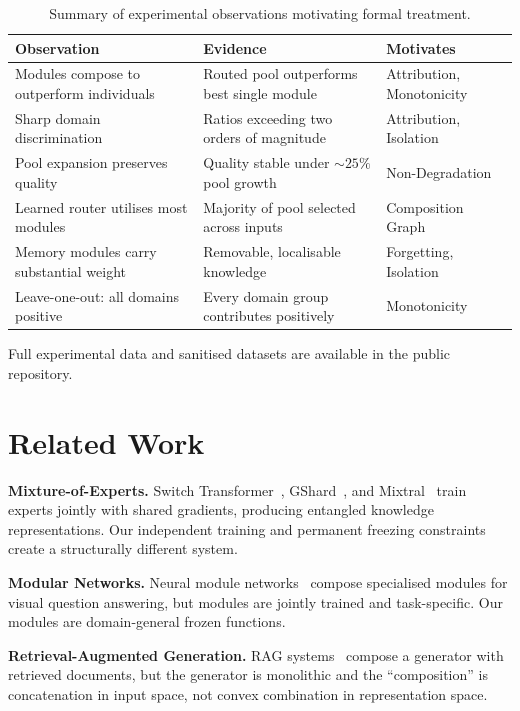 \documentclass[11pt,a4paper]{article}
\begin{document}
\begin{table}[h]
\centering
\caption{Summary of experimental observations motivating formal treatment.}
\label{tab:experiments}
\begin{tabular}{@{}lll@{}}
\toprule
\textbf{Observation} & \textbf{Evidence} & \textbf{Motivates} \\
\midrule
Modules compose to outperform individuals & Routed pool outperforms best single module & Attribution, Monotonicity \\
Sharp domain discrimination & Ratios exceeding two orders of magnitude & Attribution, Isolation \\
Pool expansion preserves quality & Quality stable under ${\sim}25\%$ pool growth & Non-Degradation \\
Learned router utilises most modules & Majority of pool selected across inputs & Composition Graph \\
Memory modules carry substantial weight & Removable, localisable knowledge & Forgetting, Isolation \\
Leave-one-out: all domains positive & Every domain group contributes positively & Monotonicity \\
\bottomrule
\end{tabular}
\end{table}

Full experimental data and sanitised datasets are available in the public repository.

\section{Related Work}
\label{sec:related}

\textbf{Mixture-of-Experts.} Switch Transformer~\cite{fedus2022switch}, GShard~\cite{lepikhin2021gshard}, and Mixtral~\cite{jiang2024mixtral} train experts jointly with shared gradients, producing entangled knowledge representations. Our independent training and permanent freezing constraints create a structurally different system.

\textbf{Modular Networks.} Neural module networks~\cite{andreas2016neural} compose specialised modules for visual question answering, but modules are jointly trained and task-specific. Our modules are domain-general frozen functions.

\textbf{Retrieval-Augmented Generation.} RAG systems~\cite{lewis2020retrieval} compose a generator with retrieved documents, but the generator is monolithic and the ``composition'' is concatenation in input space, not convex combination in representation space.
\end{document}
